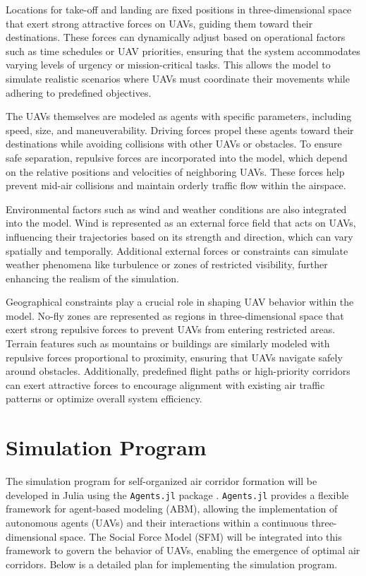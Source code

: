 \documentclass[letterpaper,11pt]{article}
\begin{document}
Locations for take-off and landing are fixed positions
in three-dimensional space that exert strong attractive forces on UAVs, guiding them toward their destinations.
These forces can dynamically adjust based on operational factors such as time schedules or UAV priorities,
ensuring that the system accommodates varying levels of urgency or mission-critical tasks.
This allows the model to simulate realistic scenarios where UAVs must coordinate their movements while adhering to predefined objectives.

The UAVs themselves are modeled as agents with specific parameters, including speed, size, and maneuverability. Driving forces propel these agents toward their destinations while avoiding collisions with other UAVs or obstacles. To ensure safe separation, repulsive forces are incorporated into the model, which depend on the relative positions and velocities of neighboring UAVs. These forces help prevent mid-air collisions and maintain orderly traffic flow within the airspace.

Environmental factors such as wind and weather conditions are also integrated into the model. Wind is represented as an external force field that acts on UAVs, influencing their trajectories based on its strength and direction, which can vary spatially and temporally. Additional external forces or constraints can simulate weather phenomena like turbulence or zones of restricted visibility, further enhancing the realism of the simulation.

Geographical constraints play a crucial role in shaping UAV behavior within the model. No-fly zones are represented as regions in three-dimensional space that exert strong repulsive forces to prevent UAVs from entering restricted areas. Terrain features such as mountains or buildings are similarly modeled with repulsive forces proportional to proximity, ensuring that UAVs navigate safely around obstacles. Additionally, predefined flight paths or high-priority corridors can exert attractive forces to encourage alignment with existing air traffic patterns or optimize overall system efficiency.


\section{Simulation Program}

The simulation program for self-organized air corridor formation will be developed in Julia using the \texttt{Agents.jl} package \cite{Agents.jl}. \texttt{Agents.jl} provides a flexible framework for agent-based modeling (ABM), allowing the implementation of autonomous agents (UAVs) and their interactions within a continuous three-dimensional space. The Social Force Model (SFM) will be integrated into this framework to govern the behavior of UAVs, enabling the emergence of optimal air corridors. Below is a detailed plan for implementing the simulation program.
\end{document}
